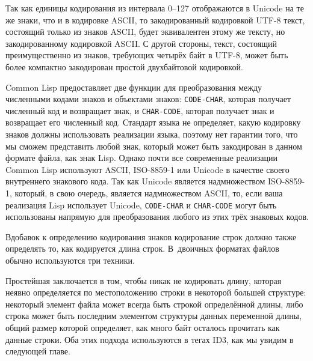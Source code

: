 Так как единицы кодирования из интервала 0--127 отображаются в Unicode на те же знаки, что
и в кодировке ASCII, то закодированный кодировкой UTF-8 текст, состоящий только из знаков
ASCII, будет эквивалентен этому же тексту, но закодированному кодировкой ASCII. С другой
стороны, текст, состоящий преимущественно из знаков, требующих четырёх байт в UTF-8, может
быть более компактно закодирован простой двухбайтовой кодировкой.

Common Lisp предоставляет две функции для преобразования между численными кодами знаков и
объектами знаков: \lstinline{CODE-CHAR}, которая получает численный код и возвращает знак, и
\lstinline{CHAR-CODE}, которая получает знак и возвращает его численный код. Стандарт языка
не определяет, какую кодировку знаков должны использовать реализации языка, поэтому нет
гарантии того, что мы сможем представить любой знак, который может быть закодирован в
данном формате файла, как знак Lisp. Однако почти все современные реализации Common Lisp
используют ASCII, ISO-8859-1 или Unicode в качестве своего внутреннего знакового кода. Так
как Unicode является надмножеством ISO-8859-1, который, в свою очередь, является
надмножеством ASCII, то, если ваша реализация Lisp использует Unicode, \lstinline{CODE-CHAR}
и \lstinline{CHAR-CODE} могут быть использованы напрямую для преобразования любого из этих
трёх знаковых кодов.

Вдобавок к определению кодирования знаков кодирование строк должно также определять то,
как кодируется длина строк. В~двоичных форматах файлов обычно используются три техники.

Простейшая заключается в том, чтобы никак не кодировать длину, которая неявно определяется
по местоположению строки в некоторой большей структуре: некоторый элемент файла может
всегда быть строкой определённой длины, либо строка может быть последним элементом
структуры данных переменной длины, общий размер которой определяет, как много байт осталось
прочитать как данные строки. Оба этих подхода используются в тегах ID3, как мы увидим в
следующей главе.

